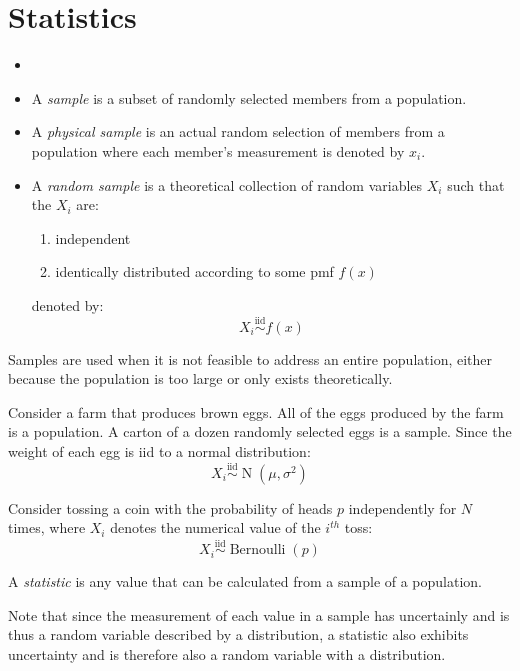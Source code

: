 \documentclass[letterpaper,12pt,fleqn]{article}
\newcommand{\iid}{\overset{\text{iid}}{\sim}}
\newcommand{\m}{\mu}
\renewcommand{\o}{\sigma}
\DeclareMathOperator{\nd}{N}
\DeclareMathOperator{\bd}{Bernoulli}
\begin{document}
\section*{Statistics}

\begin{definition}[Sample]
  \begin{itemize}[leftmargin=*]
  \item[]
  \item A \emph{sample} is a subset of randomly selected members from a population.
  \item A \emph{physical sample} is an actual random selection of members from a population where each member's measurement is
    denoted by \(x_i\).
  \item A \emph{random sample} is a theoretical collection of random variables \(X_i\) such that the \(X_i\) are:
    \begin{enumerate}
    \item independent
    \item identically distributed according to some pmf \(f(x)\)
    \end{enumerate}
    denoted by:
    \[X_i\iid f(x)\]
  \end{itemize}
\end{definition}

Samples are used when it is not feasible to address an entire population, either because the population is too large or only
exists theoretically.

\begin{example}
  Consider a farm that produces brown eggs.  All of the eggs produced by the farm is a population.  A carton of a dozen
  randomly selected eggs is a sample.  Since the weight of each egg is iid to a normal distribution:
  \[X_i\iid\nd(\m,\o^2)\]
\end{example}

\begin{example}
  Consider tossing a coin with the probability of heads \(p\) independently for \(N\) times, where \(X_i\) denotes the
  numerical value of the \(i^{th}\) toss:
  \[X_i\iid\bd(p)\]
\end{example}

\begin{definition}[Statistic]
  A \emph{statistic} is any value that can be calculated from a sample of a population.
\end{definition}

Note that since the measurement of each value in a sample has uncertainly and is thus a random variable described by a
distribution, a statistic also exhibits uncertainty and is therefore also a random variable with a distribution.
\end{document}
